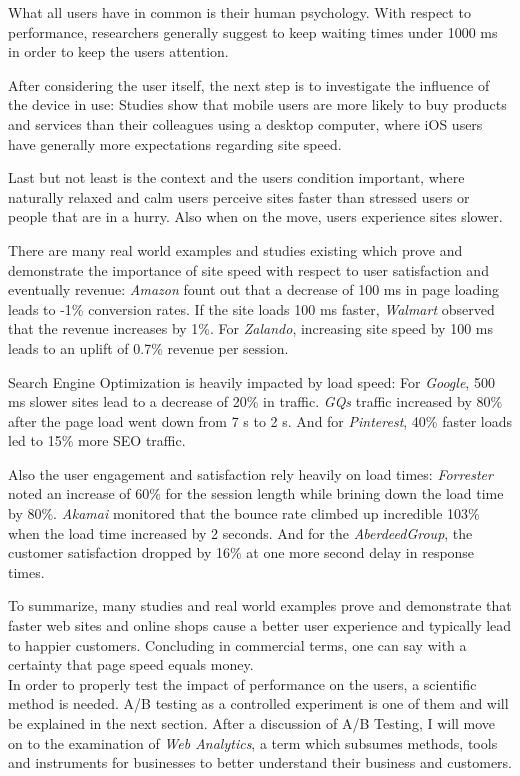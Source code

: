 What all users have in common is their human psychology. With respect to performance, researchers generally suggest to keep waiting times under 1000 ms in order to keep the users attention.

After considering the user itself, the next step is to investigate the influence of the device in use: Studies show that mobile users are more likely to buy products and services than their colleagues using a desktop computer, where iOS users have generally more expectations regarding site speed.
 
Last but not least is the context and the users condition important, where naturally relaxed and calm users perceive sites faster than stressed users or people that are in a hurry.
Also when on the move, users experience sites slower.

There are many real world examples and studies existing which prove and demonstrate the importance of site speed with respect to user satisfaction and eventually revenue:
\textit{Amazon} fount out that a decrease of 100 ms in page loading leads to -1\% conversion rates.
If the site loads 100 ms faster, \textit{Walmart} observed that the revenue increases by 1\%.
For \textit{Zalando}, increasing site speed by 100 ms leads to an uplift of 0.7\% revenue per session.

Search Engine Optimization is heavily impacted by load speed:
For \textit{Google}, 500 ms slower sites lead to a decrease of 20\% in traffic.
\textit{GQs} traffic increased by 80\% after the page load went down from 7 s to 2 s.
And for \textit{Pinterest}, 40\% faster loads led to 15\% more SEO traffic.

Also the user engagement and satisfaction rely heavily on load times:  \textit{Forrester} noted an increase of 60\% for the session length while brining down the load time by 80\%.
\textit{Akamai} monitored that the bounce rate climbed up incredible 103\% when the load time increased by 2 seconds.
And for the \textit{AberdeedGroup}, the customer satisfaction dropped by 16\% at one more second delay in response times.

To summarize, many studies and real world examples prove and demonstrate that faster web sites and online shops cause a better user experience and typically lead to happier customers. 
Concluding in commercial terms, one can say with a certainty that page speed equals money.
\\

In order to properly test the impact of performance on the users, a scientific method is needed.
A/B testing as a controlled experiment is one of them and will be explained in the next section.
After a discussion of A/B Testing, I will move on to the examination of \textit{Web Analytics}, a term which subsumes methods, tools and instruments for businesses to better understand their business and customers.


